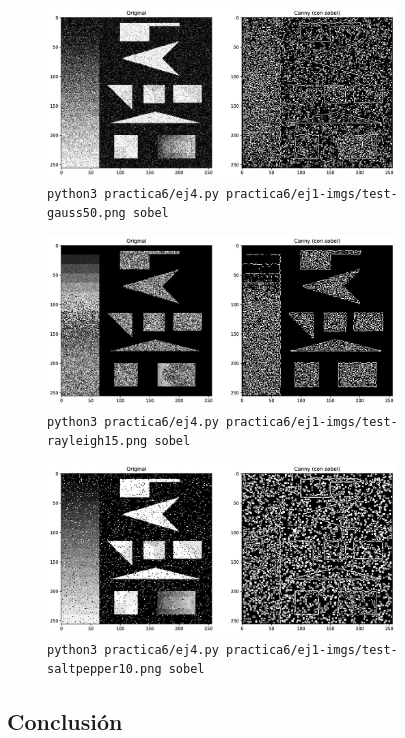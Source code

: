 \documentclass[11pt, spanish]{article}
\begin{document}
\begin{figure}[H]
\centering
    \includegraphics[height=4.5cm]{informe-imgs/ej4-sobel-test-gauss50.jpg}
    \caption{\texttt{python3 practica6/ej4.py practica6/ej1-imgs/test-gauss50.png sobel}}
\end{figure}

\begin{figure}[H]
\centering
    \includegraphics[height=4.5cm]{informe-imgs/ej4-sobel-test-rayleigh15.jpg}
    \caption{\texttt{python3 practica6/ej4.py practica6/ej1-imgs/test-rayleigh15.png sobel}}
\end{figure}

\begin{figure}[H]
\centering
    \includegraphics[height=4.5cm]{informe-imgs/ej4-sobel-test-saltpepper10.jpg}
    \caption{\texttt{python3 practica6/ej4.py practica6/ej1-imgs/test-saltpepper10.png sobel}}
\end{figure}

\newpage
\subsection{Conclusión}
\end{document}
